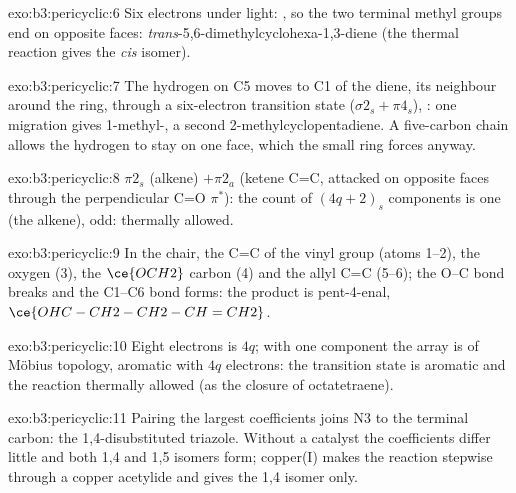 \begin{solution}{exo:b3:pericyclic:6}
Six electrons under light: , so the two terminal methyl groups end on
opposite faces: \textit{trans}-5,6-dimethylcyclohexa-1,3-diene (the thermal reaction gives
the \textit{cis} isomer).
\end{solution}

\begin{solution}{exo:b3:pericyclic:7}
The hydrogen on C5 moves to C1 of the diene, its neighbour around the ring,
through a six-electron transition state ($\sigma2_s + \pi4_s$), : one migration
gives 1-methyl-, a second 2-methylcyclopentadiene. A five-carbon chain allows the
hydrogen to stay on one face, which the small ring forces anyway.
\end{solution}

\begin{solution}{exo:b3:pericyclic:8}
$\pi2_s$ (alkene) $+ \pi2_a$ (ketene C=C, attacked on opposite faces through the
perpendicular C=O $\pi^*$): the count of $(4q + 2)_s$ components is one (the alkene), odd:
thermally allowed.
\end{solution}

\begin{solution}{exo:b3:pericyclic:9}
In the chair, the C=C of the vinyl group (atoms 1--2), the oxygen (3), the $\ce{OCH2}$
carbon (4) and the allyl C=C (5--6); the O--C bond breaks and the C1--C6 bond forms:
the product is pent-4-enal,
$\ce{OHC-CH2-CH2-CH=CH2}$.
\end{solution}

\begin{solution}{exo:b3:pericyclic:10}
Eight electrons is $4q$; with one  component the array is of Möbius
topology, aromatic with $4q$ electrons: the transition state is aromatic and the
reaction thermally allowed (as the  closure of octatetraene).
\end{solution}

\begin{solution}{exo:b3:pericyclic:11}
Pairing the largest coefficients joins N3 to the terminal carbon: the
1,4-disubstituted triazole. Without a catalyst the coefficients differ little and
both 1,4 and 1,5 isomers form; copper(I) makes the reaction stepwise through a
copper acetylide and gives the 1,4 isomer only.
\end{solution}

